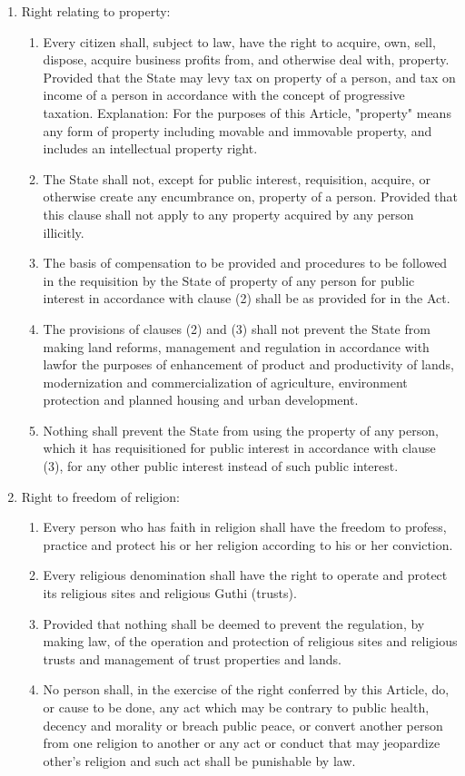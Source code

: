 \begin{questions}
\begin{solution}
\begin{enumerate}
\item Right relating to property:
\begin{enumerate}
    \item Every citizen shall, subject to law, have the right to acquire, own, sell, dispose, acquire business profits from, and otherwise deal with, property. Provided that the State may levy tax on property of a person, and tax on income of a person in accordance with the concept of progressive taxation. Explanation: For the purposes of this Article, "property" means any form of property including movable and immovable property, and includes an intellectual property right.
    \item The State shall not, except for public interest, requisition, acquire, or otherwise create any encumbrance on, property of a person. Provided that this clause shall not apply to any property acquired by any person illicitly.
    \item The basis of compensation to be provided and procedures to be followed in the requisition by the State of property of any person for public interest in accordance with clause (2) shall be as provided for in the Act.
    \item The provisions of clauses (2) and (3) shall not prevent the State from making land reforms, management and regulation in accordance with lawfor the purposes of enhancement of product and productivity of lands, modernization and commercialization of agriculture, environment protection and planned housing and urban development.
    \item Nothing shall prevent the State from using the property of any person, which it has requisitioned for public interest in accordance with clause (3), for any other public interest instead of such public interest.
\end{enumerate}

\item Right to freedom of religion:
\begin{enumerate}
    \item Every person who has faith in religion shall have the freedom to profess, practice and protect his or her religion according to his or her conviction.
    \item Every religious denomination shall have the right to operate and protect its religious sites and religious Guthi (trusts).
    \item[] Provided that nothing shall be deemed to prevent the regulation, by making law, of the operation and protection of religious sites and religious trusts and management of trust properties and lands.
    \item No person shall, in the exercise of the right conferred by this Article, do, or cause to be done, any act which may be contrary to public health, decency and morality or breach public peace, or convert another person from one religion to another or any act or conduct that may jeopardize other's religion and such act shall be punishable by law.
\end{enumerate}


\end{enumerate}
\end{solution}
\end{questions}
